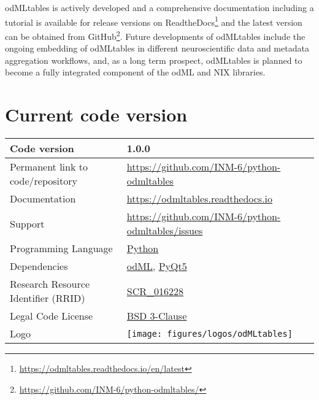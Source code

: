 {odMLtables is actively developed and a comprehensive documentation including a tutorial is available for release versions on ReadtheDocs\footnote{\url{https://odmltables.readthedocs.io/en/latest}} and the latest version can be obtained from GitHub\footnote{\url{https://github.com/INM-6/python-odmltables/}}. Future developments of odMLtables include the ongoing embedding of odMLtables in different neuroscientific data and metadata aggregation workflows, and, as a long term prospect, odMLtables is planned to become a fully integrated component of the odML and NIX libraries.


\section{Current code version}
\label{sec:code_version}

\begin{tabular}{ll}
\hline
Code version & 1.0.0 \\
\hline
Permanent link to code/repository & \href{https://github.com/INM-6/python-odmltables}{https://github.com/INM-6/python-odmltables}\\
\hline
Documentation & \href{https://odmltables.readthedocs.io}{https://odmltables.readthedocs.io}\\
\hline
Support & \href{https://github.com/INM-6/python-odmltables/issues}{https://github.com/INM-6/python-odmltables/issues}\\
\hline
Programming Language & \href{https://www.python.org/}{Python}\\
\hline
Dependencies & \href{http://g-node.github.io/python-odml/}{odML}, \href{https://wiki.python.org/moin/PyQt}{PyQt5}\\  
\hline
Research Resource Identifier (RRID) & \href{https://scicrunch.org/scicrunch/Resources/record/nlx_144509-1/SCR_016228/resolver}{SCR\_016228}\\
\hline
Legal Code License  & \href{https://github.com/INM-6/python-odmltables/blob/master/LICENSE.txt}{BSD 3-Clause} \\
\hline
Logo &
\texttt{[image: figures/logos/odMLtables]}\\
\hline
\end{tabular}
}

